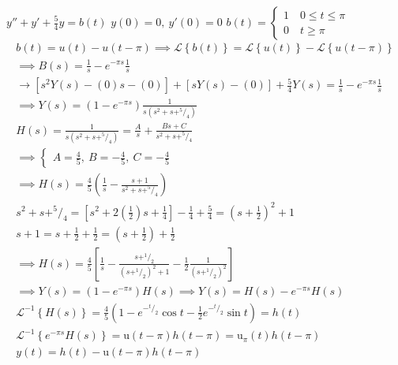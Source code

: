 \documentclass[11pt,a4paper,titlepage,final]{article}
\begin{document}
\begin{exercise*}{13.2}
	\( y''+y'+\frac{5}{4}y=b(t) \)
	\( y(0)=0,\ y'(0)=0 \)
	\( b(t) = \begin{cases}
	1 \quad	 0 \leq t \leq \pi \\ 0 \quad t \geq \pi
	\end{cases} \)
	\tcblower
	\begin{gather*}
	b(t) = u(t) - u(t-\pi) \implies \mathscr L \left\lbrace b(t) \right\rbrace = \mathscr L \left\lbrace u(t) \right\rbrace - \mathscr L \left\lbrace u(t-\pi) \right\rbrace \\
	\implies B(s) = \frac{1}{s} - e^{-\pi s}\frac{1}{s}\\
	\mathscr \rightarrow \left[s^2Y(s)-(0)s-(0)\right]+\left[sY(s)-(0)\right] + \frac{5}{4}Y(s) = \frac{1}{s}-e^{-\pi s} \frac{1}{s} \\
	\implies Y(s) = \left(1-e^{-\pi s}\right) \frac{1}{s(s^2+s+^5/_4)}\\
H(s) = \frac{1}{s(s^2+s+^5/_4)} = \frac{A}{s}+\frac{Bs+C}{s^2+s+^5/_4} \\
\implies \begin{cases}
A = \frac{4}{5},\ B= -\frac{4}{5},\ C = -\frac{4}{5}
\end{cases}\\
\implies H(s) = \frac{4}{5} \left(
\frac{1}{s}-\frac{s+1}{s^2+s+^5/_4}\right) \\
s^2+s+^5/_4 = \left[s^2+2\left(\frac{1}{2}\right)s+\frac{1}{4}\right]-\frac{1}{4}+\frac{5}{4} = \left(s+\frac{1}{2}\right)^2+1 \\
s+1 = s +\frac{1}{2}+\frac{1}{2} = \left(s+\frac{1}{2}\right) + \frac{1}{2}\\
\implies H(s) = \frac{4}{5} \left[
\frac{1}{s}-\frac{s+^1/_2}{\left(s+^1/_2\right)^2+1}-\frac{1}{2}\frac{1}{\left(s+^1/_2\right)^2} \right] \\
\implies Y(s) = \left(1-e^{-\pi s}\right)H(s) \implies Y(s) = H(s) - e^{-\pi s} H(s) \\
\mathscr L^{-1} \left\lbrace H(s) \right\rbrace = \frac{4}{5} \left(
1-e^{-^t/_2}\cos t - \frac{1}{2}e^{-^t/_2}\sin t
\right) = h(t) \\
\mathscr L^{-1} \left\lbrace  e^{-\pi s}H(s)\right\rbrace  = \mathrm u(t-\pi)h(t-\pi) = \mathrm u_\pi(t)h(t-\pi)
\\ y(t) = h(t)-\mathrm u(t-\pi)h(t-\pi)
	\end{gather*}
\end{exercise*}
\end{document}

